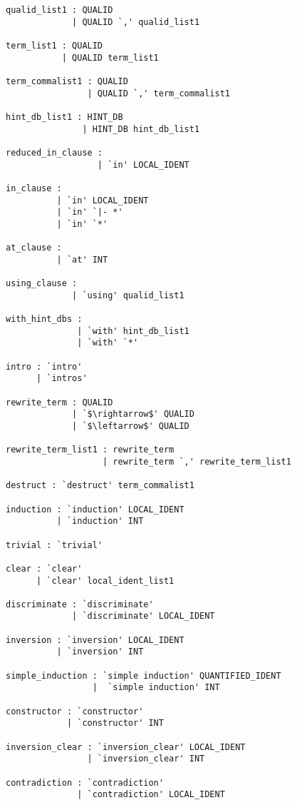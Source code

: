 \documentclass{article}
\begin{document}
\begin{lstlisting}[mathescape]
qualid_list1 : QUALID
             | QUALID `,' qualid_list1

term_list1 : QUALID
           | QUALID term_list1

term_commalist1 : QUALID
                | QUALID `,' term_commalist1

hint_db_list1 : HINT_DB
               | HINT_DB hint_db_list1

reduced_in_clause :
                  | `in' LOCAL_IDENT

in_clause :
          | `in' LOCAL_IDENT
          | `in' `|- *'
          | `in' `*'

at_clause : 
          | `at' INT

using_clause :
             | `using' qualid_list1

with_hint_dbs :
              | `with' hint_db_list1
              | `with' `*'

intro : `intro'
      | `intros'

rewrite_term : QUALID
             | `$\rightarrow$' QUALID
             | `$\leftarrow$' QUALID

rewrite_term_list1 : rewrite_term
                   | rewrite_term `,' rewrite_term_list1

destruct : `destruct' term_commalist1

induction : `induction' LOCAL_IDENT
          | `induction' INT

trivial : `trivial' 

clear : `clear'
      | `clear' local_ident_list1

discriminate : `discriminate'
             | `discriminate' LOCAL_IDENT

inversion : `inversion' LOCAL_IDENT
          | `inversion' INT

simple_induction : `simple induction' QUANTIFIED_IDENT
                 |  `simple induction' INT

constructor : `constructor'
            | `constructor' INT

inversion_clear : `inversion_clear' LOCAL_IDENT
                | `inversion_clear' INT

contradiction : `contradiction'
              | `contradiction' LOCAL_IDENT
\end{lstlisting}


\twocolumn





\end{document}
